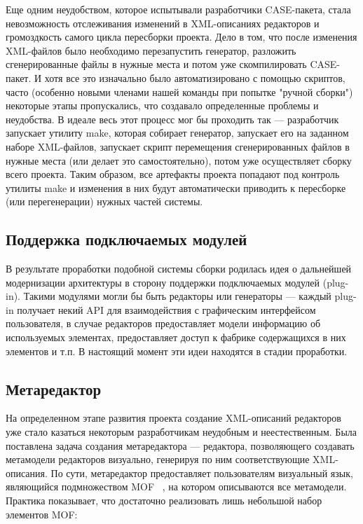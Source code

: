 \documentclass[a5paper]{article}
\begin{document}
Еще одним неудобством, которое испытывали разработчики CASE-пакета,
стала невозможность отслеживания изменений в XML-описаниях редакторов и
громоздкость самого цикла пересборки проекта. Дело в том, что после
изменения XML-файлов было необходимо перезапустить генератор, разложить
сгенерированные файлы в нужные места и потом уже скомпилировать
CASE-пакет. И хотя все это изначально было автоматизировано с помощью
скриптов, часто (особенно новыми членами нашей команды при попытке
"ручной сборки") некоторые этапы пропускались, что создавало
определенные проблемы и неудобства. В идеале весь этот процесс мог бы
проходить так --- разработчик запускает утилиту make, которая собирает
генератор, запускает его на заданном наборе XML-файлов, запускает
скрипт перемещения сгенерированных файлов в нужные места (или делает
это самостоятельно), потом уже осуществляет сборку всего проекта. Таким
образом, все артефакты проекта попадают под контроль утилиты make и
изменения в них будут автоматически приводить к пересборке (или
перегенерации) нужных частей системы.

\subsection{Поддержка подключаемых модулей}

В результате проработки подобной системы сборки родилась идея о
дальнейшей модернизации архитектуры в сторону поддержки подключаемых
модулей (plug-in). Такими модулями могли бы быть редакторы или
генераторы --- каждый plug-in получает некий API для взаимодействия с
графическим интерфейсом пользователя, в случае редакторов предоставляет
модели информацию об используемых элементах, предоставляет доступ к
фабрике содержащихся в них элементов и т.п. В настоящий момент эти идеи
находятся в стадии проработки.

\subsection{Метаредактор}

На определенном этапе развития проекта создание XML-описаний редакторов
уже стало казаться некоторым разработчикам неудобным и неестественным.
Была поставлена задача создания метаредактора --- редактора, позволяющего
создавать метамодели редакторов визуально, генерируя по ним
соответствующие XML-описания. По сути, метаредактор предоставляет
пользователям визуальный язык, являющийся подмножеством
MOF~\cite{mof} , на котором описываются все
метамодели. Практика показывает, что достаточно реализовать лишь
небольшой набор элементов MOF: 
\end{document}
